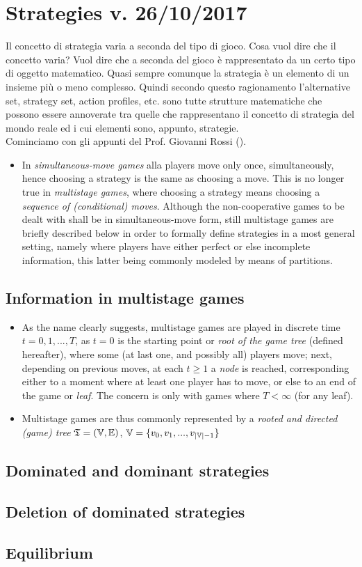 \chapter{Strategies v. 26/10/2017}
Il concetto di strategia varia a seconda del tipo di gioco. Cosa vuol dire che il concetto varia? Vuol dire che a seconda del gioco \`e rappresentato da un certo tipo di oggetto matematico. 
Quasi sempre comunque la strategia \`e un elemento di un insieme pi\`u o meno complesso. Quindi secondo questo ragionamento l'alternative set, strategy set, action profiles, etc. sono tutte strutture matematiche che possono essere annoverate tra quelle che rappresentano il concetto di strategia del mondo reale ed i cui elementi sono, appunto, strategie. \\

Cominciamo con gli appunti del Prof. Giovanni Rossi (\cite{rossi26102017}).

\begin{itemize}
	\item In \emph{simultaneous-move games} alla players move only once, simultaneously, hence choosing a strategy is the same as choosing a move. This is no longer true in \emph{multistage games}, where choosing a strategy means choosing a \emph{sequence of (conditional) moves}. Although the non-cooperative games to be dealt with shall be in simultaneous-move form, still multistage games are briefly described below in order to formally define strategies in a most general setting, namely where players have either perfect or else incomplete information, this latter being commonly modeled by means of partitions.
\end{itemize}

\section{Information in multistage games}

\begin{itemize}
	\item As the name clearly suggests, multistage games are played in discrete time $t = 0, 1, ..., T$, as $t = 0$ is the starting point or \emph{root of the game tree} (defined hereafter), where some (at last one, and possibly all) players move; next, depending on previous moves, at each $t \ge 1$ a \emph{node} is reached, corresponding either to a moment where at least one player has to move, or else to an end of the game or \emph{leaf}. The concern is only with games where $T < \infty$ (for any leaf).
	
	\item Multistage games are thus commonly represented by a \emph{rooted and directed (game) tree} $\mathfrak{T} = (\mathbb{V}, \mathbb{E})$, $\mathbb{V} = \{v_0, v_1, ..., v_{|\mathbb{V}|-1}\}$
\end{itemize}




\section{Dominated and dominant strategies}
\section{Deletion of dominated strategies}
\section{Equilibrium}